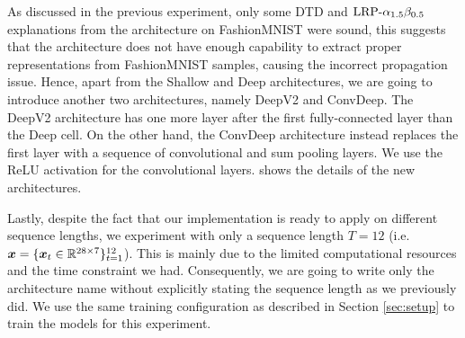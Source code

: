 As discussed in the previous experiment, only some DTD and $\text{LRP-}\alpha_{1.5}\beta_{0.5}$ explanations from the  architecture on FashionMNIST were sound, this suggests that the architecture does not have enough capability to extract proper representations from FashionMNIST samples, causing the incorrect propagation issue. Hence, apart from the Shallow and Deep architectures, we are going to  introduce another two architectures, namely DeepV2 and ConvDeep. The DeepV2 architecture has one more layer after the first fully-connected layer than the Deep cell. On the other hand, the ConvDeep architecture instead replaces the first layer with  a sequence of convolutional and sum pooling layers. We use the ReLU activation for the convolutional layers. \addfigure{\ref{fig:deep_conv_arch}} shows the details of the new architectures.




\begin{figure}[!htb]
\centering

     \hfill

\label{fig:deep_conv_arch}
\end{figure}

Lastly, despite the fact that  our implementation is ready to apply on different sequence lengths,  we experiment with only a sequence length $T=12$  (i.e. $\boldsymbol{x} = \{ \boldsymbol{x}_t \in \mathbb{R}^{28 \times 7}\}_{t=1}^{12}$). This is mainly due to the limited computational resources and the time constraint we had. Consequently, we are going to write only the architecture name without explicitly stating the sequence length as we previously did.  We use the same training configuration as described in Section \ref{sec:setup} to train the models for this experiment.


